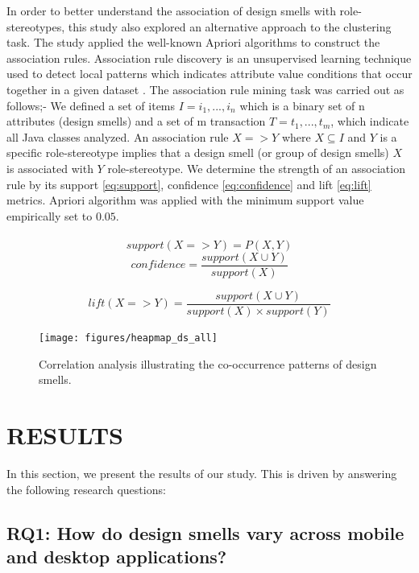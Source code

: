 \documentclass[AMA,Times1COL]{WileyNJDv5} %
\begin{document}
	In order to better understand the association of design smells with role-stereotypes, this study also explored an alternative approach to the clustering task. The study applied the well-known Apriori algorithms \cite{agrawal1996fast} to construct the association rules. Association rule discovery is an unsupervised learning technique used to detect local patterns which indicates attribute value conditions that occur together in a given dataset \cite{al2014improved}. The association rule mining task was carried out as follows;- We defined a set of items $I={i_1,...,i_n}$ which is a binary set of n attributes (design smells) and a set of m transaction $T={t_1,...,t_m}$, which indicate all Java classes analyzed. An association rule $X => Y$ where $X \subseteq I$ and $Y$ is a specific role-stereotype implies that a design smell (or group of design smells) $X$ is associated with $Y$ role-stereotype.  We determine the strength of an association rule by its support \ref{eq:support}, confidence \ref{eq:confidence} and lift \ref{eq:lift} metrics. Apriori algorithm was applied with the minimum support value empirically set to $0.05$.
	\\~\\
	\begin{equation}
		support (X => Y) = P (X, Y)\label{eq:support}
	\end{equation}
	\begin{equation}
		confidence = 	\frac{support (X \cup Y)}{support (X)} \label{eq:confidence}
	\end{equation}
	
	\begin{equation}
		lift (X => Y) = \frac{support (X \cup Y)}{support (X) \times support (Y)} \label{eq:lift}
	\end{equation}
	
	\begin{figure}[!h]
	\centerline{\texttt{[image: figures/heapmap\_ds\_all]}}
	\caption{Correlation analysis illustrating the co-occurrence patterns of design smells.\label{fig:headmapdsall}}
	\end{figure}
	
	\section{RESULTS}\label{sec:result}
	
	In this section, we present the results of our study. This is driven by answering the following research questions:
	\subsection*{RQ1: How do design smells vary across mobile and desktop applications? }
	
\end{document}
